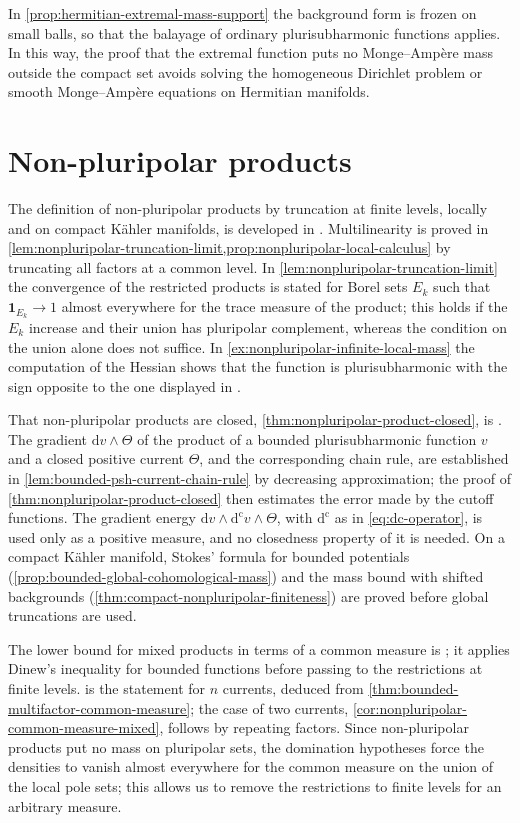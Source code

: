 In \cref{prop:hermitian-extremal-mass-support} the background form is frozen on small balls, so that the balayage of ordinary plurisubharmonic functions applies. In this way, the proof that the extremal function puts no Monge--Amp\`ere mass outside the compact set avoids solving the homogeneous Dirichlet problem or smooth Monge--Amp\`ere equations on Hermitian manifolds.

\section{Non-pluripolar products}\label{sec:history-nonpluripolar}
The definition of non-pluripolar products by truncation at finite levels, locally and on compact K\"ahler manifolds, is developed in \cite[Section 1.2, Proposition 1.4, Lemma 1.5 and Proposition 1.6]{BEGZ10}. Multilinearity is proved in \cref{lem:nonpluripolar-truncation-limit,prop:nonpluripolar-local-calculus} by truncating all factors at a common level. In \cref{lem:nonpluripolar-truncation-limit} the convergence of the restricted products is stated for Borel sets $E_k$ such that $\mathbf1_{E_k}\to1$ almost everywhere for the trace measure of the product; this holds if the $E_k$ increase and their union has pluripolar complement, whereas the condition on the union alone does not suffice. In \cref{ex:nonpluripolar-infinite-local-mass} the computation of the Hessian shows that the function is plurisubharmonic with the sign opposite to the one displayed in \cite[Example 1.3]{BEGZ10}.

That non-pluripolar products are closed, \cref{thm:nonpluripolar-product-closed}, is \cite[Theorem 1.8 and Lemma 1.9]{BEGZ10}. The gradient $\mathrm dv\wedge\Theta$ of the product of a bounded plurisubharmonic function $v$ and a closed positive current $\Theta$, and the corresponding chain rule, are established in \cref{lem:bounded-psh-current-chain-rule} by decreasing approximation; the proof of \cref{thm:nonpluripolar-product-closed} then estimates the error made by the cutoff functions. The gradient energy $\mathrm dv\wedge\mathrm d^{\mathrm c}v\wedge\Theta$, with $\mathrm d^{\mathrm c}$ as in \eqref{eq:dc-operator}, is used only as a positive measure, and no closedness property of it is needed. On a compact K\"ahler manifold, Stokes' formula for bounded potentials (\cref{prop:bounded-global-cohomological-mass}) and the mass bound with shifted backgrounds (\cref{thm:compact-nonpluripolar-finiteness}) are proved before global truncations are used.

The lower bound for mixed products in terms of a common measure is \cite[Proposition 1.11 and its proof]{BEGZ10}; it applies Dinew's inequality for bounded functions before passing to the restrictions at finite levels.  is the statement for $n$ currents, deduced from \cref{thm:bounded-multifactor-common-measure}; the case of two currents, \cref{cor:nonpluripolar-common-measure-mixed}, follows by repeating factors. Since non-pluripolar products put no mass on pluripolar sets, the domination hypotheses force the densities to vanish almost everywhere for the common measure on the union of the local pole sets; this allows us to remove the restrictions to finite levels for an arbitrary measure.

